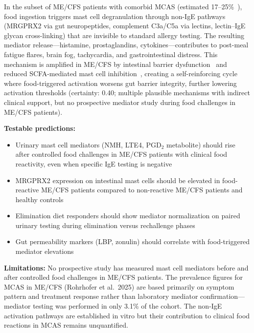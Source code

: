 \begin{hypothesis}
\label{hyp:food-mast-cell-mecfs}
In the subset of ME/CFS patients with comorbid MCAS (estimated 17--25\%~\cite{Rohrhofer2025mecfsmast}), food ingestion triggers mast cell degranulation through non-IgE pathways (MRGPRX2 via gut neuropeptides, complement C3a/C5a via lectins, lectin--IgE glycan cross-linking) that are invisible to standard allergy testing. The resulting mediator release---histamine, prostaglandins, cytokines---contributes to post-meal fatigue flares, brain fog, tachycardia, and gastrointestinal distress. This mechanism is amplified in ME/CFS by intestinal barrier dysfunction~\cite{Rohrhofer2024stratification} and reduced SCFA-mediated mast cell inhibition~\cite{Folkerts2018fiber}, creating a self-reinforcing cycle where food-triggered activation worsens gut barrier integrity, further lowering activation thresholds (certainty: 0.40; multiple plausible mechanisms with indirect clinical support, but no prospective mediator study during food challenges in ME/CFS patients).

\textbf{Testable predictions:}
\begin{itemize}
    \item Urinary mast cell mediators (NMH, LTE4, PGD$_2$ metabolite) should rise after controlled food challenges in ME/CFS patients with clinical food reactivity, even when specific IgE testing is negative
    \item MRGPRX2 expression on intestinal mast cells should be elevated in food-reactive ME/CFS patients compared to non-reactive ME/CFS patients and healthy controls
    \item Elimination diet responders should show mediator normalization on paired urinary testing during elimination versus rechallenge phases
    \item Gut permeability markers (LBP, zonulin) should correlate with food-triggered mediator elevations
\end{itemize}

\textbf{Limitations:} No prospective study has measured mast cell mediators before and after controlled food challenges in ME/CFS patients. The prevalence figures for MCAS in ME/CFS (Rohrhofer et al.\ 2025) are based primarily on symptom pattern and treatment response rather than laboratory mediator confirmation---mediator testing was performed in only 3.1\% of the cohort. The non-IgE activation pathways are established in vitro but their contribution to clinical food reactions in MCAS remains unquantified.
\end{hypothesis}

